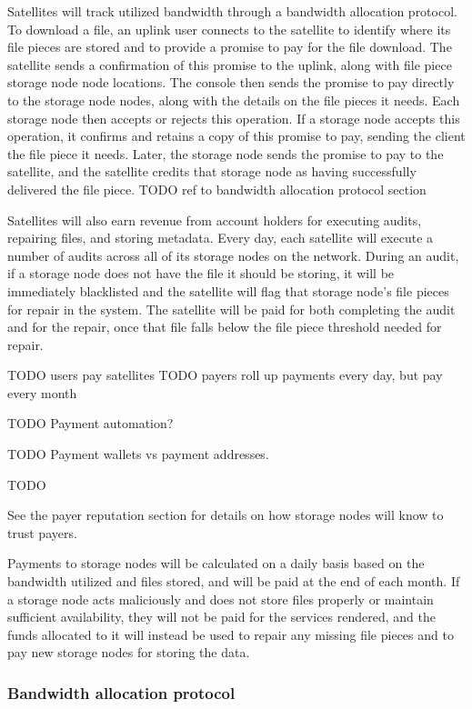 \documentclass[a4paper,10pt]{article} \usepackage[utf8]{inputenc}
\newcommand{\todo}[1]{{\color{red} TODO #1 }}
\begin{document}
Satellites will track utilized bandwidth through a bandwidth allocation
protocol. To download a file, an uplink user connects to the satellite to
identify where its file pieces are stored and to provide a promise to pay for
the file download. The satellite sends a confirmation of this promise
to the uplink, along with file piece storage node node locations.
The console then sends the promise to pay directly
to the storage node nodes, along with the details on the file pieces it needs.
Each storage node then accepts or rejects this operation.
If a storage node accepts this
operation, it confirms and retains a copy of this promise to pay, sending the
client the file piece it needs. Later, the storage node sends the promise to
pay to
the satellite, and the satellite credits that storage node as having
successfully delivered the file piece.
\todo{ref to bandwidth allocation protocol section}

Satellites will also earn revenue from account holders for executing audits,
repairing files, and storing metadata. Every day, each satellite will execute
a number of audits across all of its storage nodes on the network. During an
audit,
if a storage node does not have the file it should be storing, it will be
immediately
blacklisted and the satellite will flag that storage node’s file pieces for
repair
in the system.
The satellite will be paid for both completing the audit
and for the repair,
once that file falls below the file piece threshold needed for
repair.

\todo{users pay satellites}
\todo{payers roll up payments every day, but pay every month}

\todo{Payment automation?}

\todo{Payment wallets vs payment addresses. }

\todo{}

See the payer reputation section for details on
how storage nodes will know to trust payers.

Payments to storage nodes will be calculated on a daily basis based on the
bandwidth
utilized and files stored, and will be paid at the end of each month.
If a storage node acts
maliciously and does not store files properly or maintain sufficient
availability, they will not be paid for the services rendered, and the funds
allocated to it will instead be used to repair any missing
file pieces and to pay new storage nodes for storing the data.

\subsubsection{Bandwidth allocation protocol}
\end{document}
